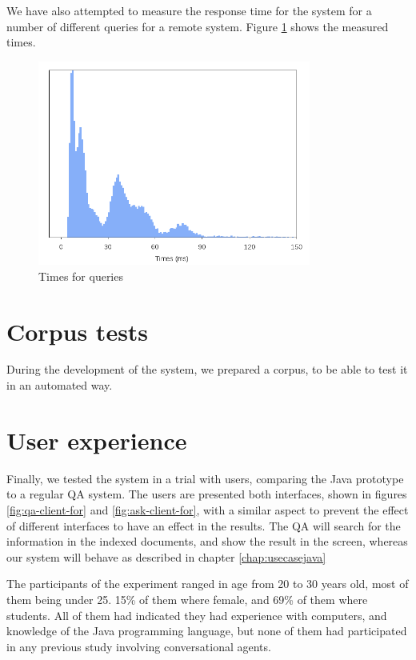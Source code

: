 We have also attempted to measure the response time for the system for a number of different queries for a remote system. Figure \ref{fig:times-demos} shows the measured times.

\begin{figure}[!htbp]
    \centering
    \includegraphics[width=0.8\textwidth]{img/test/times.png}
    \caption{Times for queries}
    \label{fig:times-demos}
\end{figure}

\section{Corpus tests}

During the development of the system, we prepared a corpus, to be able to test it in an automated way.

\section{User experience}

Finally, we tested the system in a trial with users, comparing the Java prototype to a regular \ac{QA} system. The users are presented both interfaces, shown in figures \ref{fig:qa-client-for} and \ref{fig:ask-client-for}, with a similar aspect to prevent the effect of different interfaces to have an effect in the results. The \ac{QA} will search for the information in the indexed documents, and show the result in the screen, whereas our system will behave as described in chapter \ref{chap:usecasejava}

The participants of the experiment ranged in age from 20 to 30 years old, most of them being under 25. 15\% of them where female, and 69\% of them where students. All of them had indicated they had experience with computers, and knowledge of the Java programming language, but none of them had participated in any previous study involving conversational agents.

